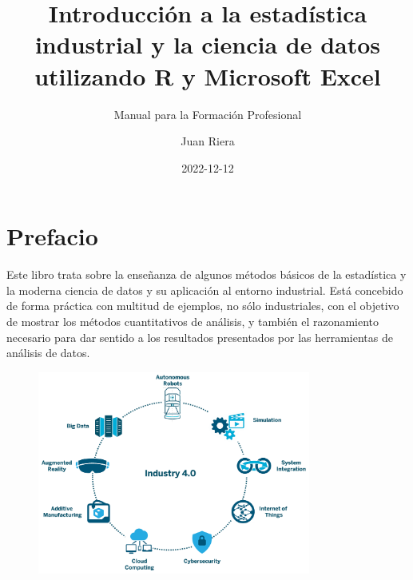 \documentclass[
  letterpaper,
]{scrbook}
\title{Introducción a la estadística industrial y la ciencia de datos
utilizando R y Microsoft Excel}
\subtitle{Manual para la Formación Profesional}
\author{Juan Riera}
\date{2022-12-12}
\renewcommand*\contentsname{Table of contents}
\newcommand\contentsname{Table of contents}
\begin{document}
\frontmatter
\maketitle
\ifdefined\Shaded\renewenvironment{Shaded}{\begin{tcolorbox}[boxrule=0pt, enhanced, sharp corners, interior hidden, borderline west={3pt}{0pt}{shadecolor}, frame hidden, breakable]}{\end{tcolorbox}}\fi

\renewcommand*\contentsname{Table of contents}
{
\setcounter{tocdepth}{2}
\tableofcontents
}
\mainmatter
{}

\hypertarget{prefacio}{%
\chapter*{Prefacio}\label{prefacio}}

Este libro trata sobre la enseñanza de algunos métodos básicos de la
estadística y la moderna ciencia de datos y su aplicación al entorno
industrial. Está concebido de forma práctica con multitud de ejemplos,
no sólo industriales, con el objetivo de mostrar los métodos
cuantitativos de análisis, y también el razonamiento necesario para dar
sentido a los resultados presentados por las herramientas de análisis de
datos.

\begin{figure}[!b]
   \centering
\includegraphics[width=0.8\textwidth]{01-imagenes/Industry40.png}
 \label{fig:img1}
\end{figure}
\end{document}
